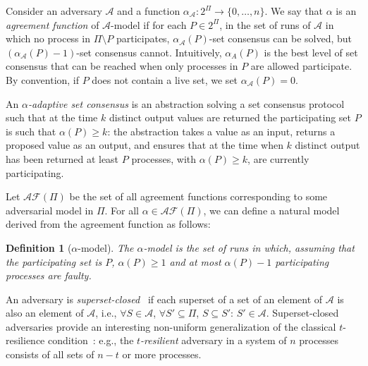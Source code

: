 \documentclass[a4paper]{article}
\newtheorem{definition}{Definition}
\def\A{\ensuremath{\mathcal{A}}}
\begin{document}
Consider  an
adversary $\A$ and a function $\alpha_{\A}: 2^{\Pi} \to \{0,\ldots,n\}$. 
We say that $\alpha$ is an \emph{agreement function} of $\A$-model if
for each $P\in 2^{\Pi}$, in the set of runs of $\A$ in which no process
in $\Pi\setminus P$ participates,
$\alpha_{\A}(P)$-set consensus can be solved,  but $(\alpha_{\A}(P)-1)$-set consensus cannot.
Intuitively, $\alpha_A(P)$ is the best level of set consensus that
can be reached when only processes in $P$ are allowed participate.
By convention, if $P$ does not contain a live set, we set $\alpha_\A(P)=0$.

An \emph{$\alpha$-adaptive set consensus} is 
an abstraction solving a set consensus protocol  
such that at the time $k$ distinct output values are returned
the participating set $P$ is such that $\alpha(P)\geq k$: 
the abstraction takes a value as an input, 
returns a proposed value as an output,  and ensures that at the
time when $k$ distinct output has been returned at least
$P$ processes, with $\alpha(P)\geq k$, are currently participating.   

Let $\mathcal{AF}(\Pi)$ be the set of all agreement functions 
corresponding to some adversarial model in $\Pi$. 
For all $\alpha\in\mathcal{AF}(\Pi)$, we can define a natural model
derived from the agreement function as follows:
\begin{definition}[$\alpha$-model] 
  The \emph{$\alpha$-model} is the set of
  runs in which, assuming that the participating set is $P$,
  $\alpha(P)\geq 1$ and  at most $\alpha(P)-1$ participating processes are faulty.
\end{definition}

%

An adversary is \emph{superset-closed}~\cite{Kuz12} if each superset of a set of an
element of $\A$ is also an element of $\A$, i.e.,
$\forall S\in \A$, $\forall S'\subseteq \Pi$, $S\subseteq S'$: $S'\in\A$. 
Superset-closed adversaries provide an interesting non-uniform
generalization of the classical $t$-resilience condition~\cite{HR10}:
e.g., the \emph{$t$-resilient} adversary in a
system of $n$ processes consists of all sets of $n-t$ or more processes.
\end{document}

